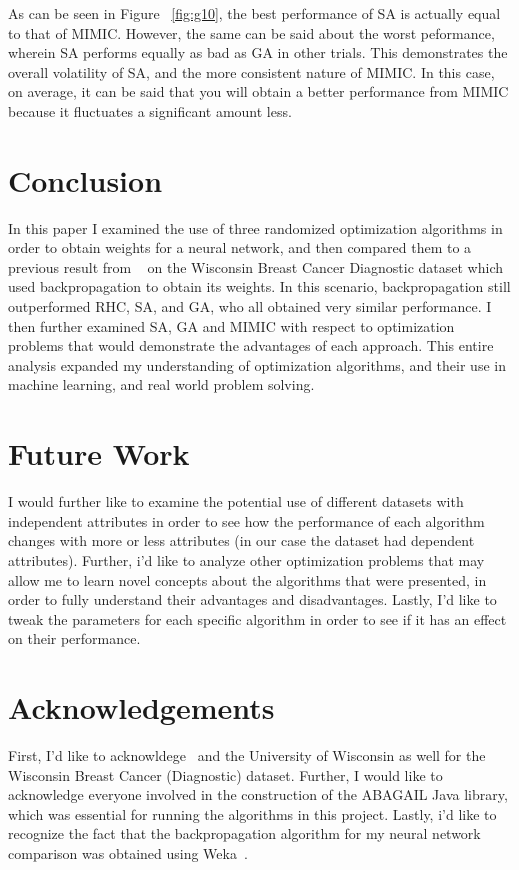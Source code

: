 \documentclass[annual]{acmsiggraph}
\begin{document}
As can be seen in Figure ~\ref{fig:g10}, the best performance of SA is actually equal to that of MIMIC. However, the same
can be said about the worst peformance, wherein SA performs equally as bad as GA in other trials. This demonstrates the overall
volatility of SA, and the more consistent nature of MIMIC. In this case, on average, it can be said that you will obtain a better
performance from MIMIC because it fluctuates a significant amount less.
\section{Conclusion}
In this paper I examined the use of three randomized optimization algorithms in order to obtain weights for a neural network,
and then compared them to a previous result from ~\cite{Castro:2013} on the Wisconsin Breast Cancer Diagnostic dataset which
used backpropagation to obtain its weights. In this scenario, backpropagation still outperformed RHC, SA, and GA, who all
obtained very similar performance. I then further examined SA, GA and MIMIC with respect to optimization problems that would
demonstrate the advantages of each approach. This entire analysis expanded my understanding of optimization algorithms, and
their use in machine learning, and real world problem solving.
\section{Future Work}
I would further like to examine the potential use of different datasets with independent attributes in order to see how the
performance of each algorithm changes with more or less attributes (in our case the dataset had dependent attributes). Further,
i'd like to analyze other optimization problems that may allow me to learn novel concepts about the algorithms that were presented,
in order to fully understand their advantages and disadvantages. Lastly, I'd like to tweak the parameters for each specific 
algorithm in order to see if it has an effect on their performance.
\section*{Acknowledgements}
First, I'd like to acknowldege~\cite{Frank+Asuncion:2010} and the 
University of Wisconsin as well for the Wisconsin Breast Cancer 
(Diagnostic) dataset. Further, I would like to acknowledge everyone 
involved in the construction of the ABAGAIL Java library, which was 
essential for running the algorithms in this project. Lastly, i'd
like to recognize the fact that the backpropagation algorithm for my
neural network comparison was obtained using Weka~\cite{Hall_weka:2010}.


\end{document}
